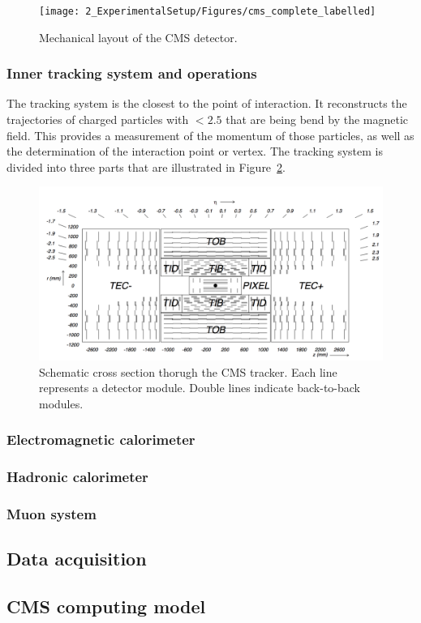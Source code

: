\begin{figure}[ht]
   \centering
	\texttt{[image: 2\_ExperimentalSetup/Figures/cms\_complete\_labelled]}
	\caption{Mechanical layout of the CMS detector\cite{CMSdraw}.}
	\label{fig:CMS}
\end{figure}
	

\subsubsection{Inner tracking system and operations}
The tracking system is the closest to the point of interaction. It reconstructs the trajectories of charged particles with \abspsrap $<2.5$ that are being bend by the magnetic field. This provides a measurement of the momentum of those particles, as well as the determination of the interaction point or vertex. The tracking system is divided into three parts that are illustrated in Figure~\ref{fig:Tracker}.

\begin{figure}[ht]
	\centering
	\includegraphics[width=\textwidth]{2_ExperimentalSetup/Figures/imageedit_3_5170744545}
	\caption{Schematic cross section thorugh the CMS tracker. Each line represents a detector module. Double lines indicate back-to-back modules\cite{Chatrchyan:2008aa}.}
	\label{fig:Tracker}
\end{figure}


\subsubsection{Electromagnetic calorimeter}
\subsubsection{Hadronic calorimeter}
\subsubsection{Muon system}

\subsection{Data acquisition}
\subsection{CMS computing model}
